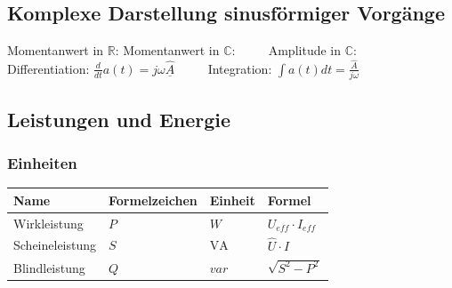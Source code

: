 	\subsection{Komplexe Darstellung sinusförmiger Vorgänge}
	Momentanwert in $\mathbb{R}$:  \qquad
	Momentanwert in $\mathbb{C}$:  $\qquad$ 
	Amplitude in $\mathbb{C}$: \\
	
	Differentiation: $\frac{d}{dt} a(t) = j \omega \underline{\hat{A}}$ $\qquad$ 
	Integration: $\int a(t) dt = \frac{\hat{A}}{j \omega}$
	
	\subsection{Leistungen und Energie}
		\subsubsection{Einheiten}
		
		\begin{tabular}{|l|l|l|l|}
		\hline
			Name & Formelzeichen & Einheit & Formel \\
		\hline
			Wirkleistung & $P$ & $W$ & $U_{eff} \cdot I_{eff}$ \\
		\hline
			Scheineleistung & $S$ & $\mathrm{VA}$ & $\hat{U} \cdot \hat{I}$ \\
		\hline
			Blindleistung & $Q$ & $var$ & $\sqrt{S^2 - P^2}$\\
		\hline
		\end{tabular}\\
		
